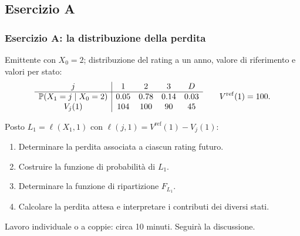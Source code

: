 

\subsection{Esercizio A}%

\begin{frame}%
%

\frametitle{Esercizio A: la distribuzione della perdita}%


Emittente con $X_{0}=2$; distribuzione del rating a un anno, valore di
riferimento e valori per stato:
\[%
\begin{array}
[c]{c|cccc}%
j & 1 & 2 & 3 & D\\\hline
\Prob(X_{1}=j\mid X_{0}=2) & 0.05 & 0.78 & 0.14 & 0.03\\
V_{j}(1) & 104 & 100 & 90 & 45
\end{array}
\qquad V^{\mathrm{ref}}(1)=100.
\]


\medskip

Posto $L_{1}=\ell(X_{1},1)$ con $\ell(j,1)=V^{\mathrm{ref}}(1)-V_{j}(1)$:

\begin{enumerate}
\item[1.] Determinare la perdita associata a ciascun rating futuro.

\item[2.] Costruire la funzione di probabilit\`{a} di $L_{1}$.

\item[3.] Determinare la funzione di ripartizione $F_{L_{1}}$.

\item[4.] Calcolare la perdita attesa e interpretare i contributi dei diversi stati.
\end{enumerate}

\medskip

\begin{center}
{\small Lavoro individuale o a coppie: circa 10 minuti. Seguir\`{a} la
discussione.}
\end{center}

%

\transboxout
\end{frame}%


